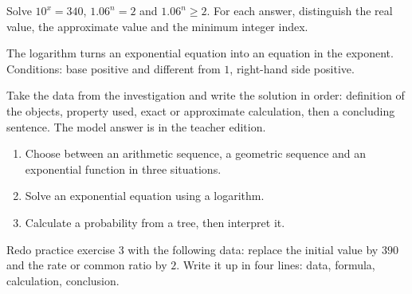 \begin{activite}
Solve $10^x=340$, $1.06^n=2$ and $1.06^n\geq2$. For each answer, distinguish the real value, the approximate value and the minimum integer index.

\end{activite}

\begin{traceecrite}The logarithm turns an exponential equation into an equation in the exponent. Conditions: base positive and different from $1$, right-hand side positive.\end{traceecrite}

\begin{exemple}
Take the data from the investigation and write the solution in order: definition of the objects, property used, exact or approximate calculation, then a concluding sentence. The model answer is in the teacher edition.
\end{exemple}

\begin{exercice}[-- essential]
\begin{enumerate}\item Choose between an arithmetic sequence, a geometric sequence and an exponential function in three situations.\item Solve an exponential equation using a logarithm.\item Calculate a probability from a tree, then interpret it.\end{enumerate}
\end{exercice}


\begin{dm}Redo practice exercise 3 with the following data: replace the initial value by $390$ and the rate or common ratio by $2$. Write it up in four lines: data, formula, calculation, conclusion.\end{dm}

